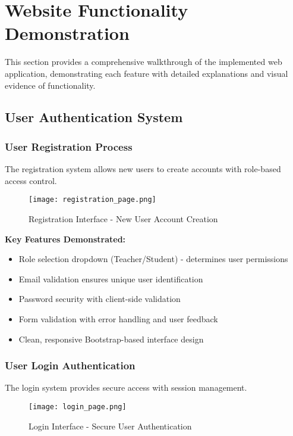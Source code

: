 \documentclass[12pt,a4paper]{article}
\begin{document}
\section{Website Functionality Demonstration}

This section provides a comprehensive walkthrough of the implemented web application, demonstrating each feature with detailed explanations and visual evidence of functionality.

\subsection{User Authentication System}

\subsubsection{User Registration Process}
The registration system allows new users to create accounts with role-based access control.

\begin{figure}[h]
\centering
\texttt{[image: registration\_page.png]}
\caption{Registration Interface - New User Account Creation}
\label{fig:registration}
\end{figure}

\textbf{Key Features Demonstrated:}
\begin{itemize}
    \item Role selection dropdown (Teacher/Student) - determines user permissions
    \item Email validation ensures unique user identification
    \item Password security with client-side validation
    \item Form validation with error handling and user feedback
    \item Clean, responsive Bootstrap-based interface design
\end{itemize}

\subsubsection{User Login Authentication}
The login system provides secure access with session management.

\begin{figure}[h]
\centering
\texttt{[image: login\_page.png]}
\caption{Login Interface - Secure User Authentication}
\label{fig:login}
\end{figure}
\end{document}
